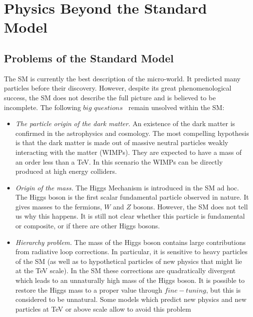 \section{Physics Beyond the Standard Model}

\subsection{Problems of the Standard Model}

The SM is currently the best description of the micro-world. It predicted many particles before their discovery. However, despite its great phenomenological success, the SM does not describe the full picture and is believed to be incomplete. The following $big$ $questions$~\cite{Gershtein:2013iqa} remain unsolved within the SM:
\begin{itemize}
\item \textit{The particle origin of the dark matter.} An existence of the dark matter is confirmed in the astrophysics and cosmology. The most compelling hypothesis is that the dark matter is made out of massive neutral particles weakly interacting with the matter (WIMPs). They are expected to have a mass of an order less than a TeV. In this scenario the WIMPs can be directly produced at high energy colliders.
\item \textit{Origin of the mass.} The Higgs Mechanism is introduced in the SM ad hoc. The Higgs boson is the first scalar fundamental particle observed in nature. It gives masses to the fermions, $W$ and $Z$ bosons. However, the SM does not tell us why this happens. It is still not clear whether this particle is fundamental or composite, or if there are other Higgs bosons.
\item \textit{Hierarchy problem.} The mass of the Higgs boson contains large contributions from radiative loop corrections. In particular, it is sensitive to heavy particles of the SM (as well as to hypothetical particles of new physics that might lie at the TeV scale). 
In the SM these corrections are quadratically divergent which leads to an unnaturally high mass of the Higgs boson. It is possible to restore the Higgs mass to a proper value through $fine-tuning$, but this is considered to be unnatural. Some models which predict new physics and new particles at TeV or above scale allow to avoid this problem

\end{itemize}

